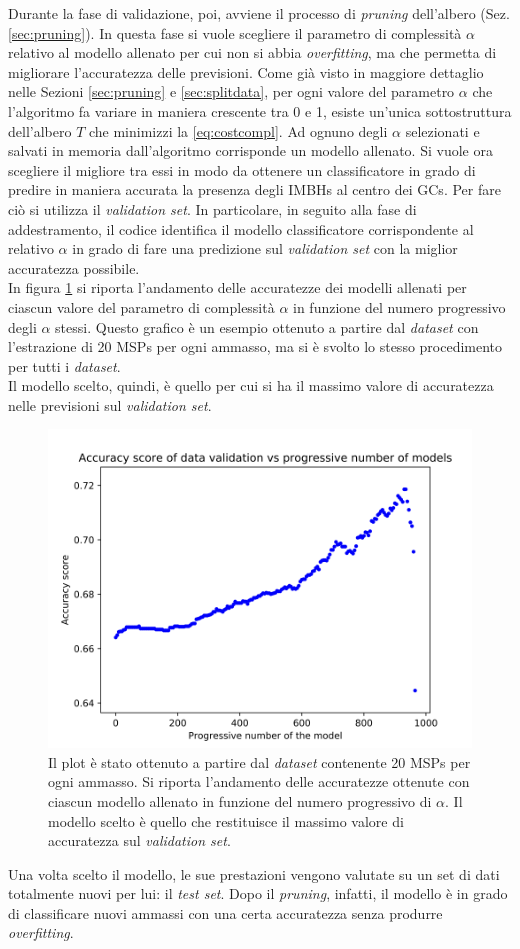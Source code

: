 Durante la fase di validazione, poi, avviene il processo di \textit{pruning} dell'albero (Sez. \ref{sec:pruning}). In questa fase si vuole scegliere il parametro di complessità $\alpha$ relativo al modello allenato per cui non si abbia \textit{overfitting}, ma che permetta di migliorare l'accuratezza delle previsioni. Come già visto in maggiore dettaglio nelle Sezioni \ref{sec:pruning} e \ref{sec:splitdata}, per ogni valore del parametro $\alpha$ che l'algoritmo fa variare in maniera crescente tra 0 e 1, esiste un'unica sottostruttura dell'albero $T$ che minimizzi la \ref{eq:costcompl}. Ad ognuno degli $\alpha$ selezionati e salvati in memoria dall'algoritmo corrisponde un modello allenato. Si vuole ora scegliere il migliore tra essi in modo da ottenere un classificatore in grado di predire in maniera accurata la presenza degli IMBHs al centro dei GCs. Per fare ciò si utilizza il \textit{validation set}. In particolare, in seguito alla fase di addestramento, il codice identifica il modello classificatore corrispondente al relativo $\alpha$ in grado di fare una predizione sul \textit{validation set} con la miglior accuratezza possibile.\\
In figura \ref{fig:acc_20part} si riporta l'andamento delle accuratezze dei modelli allenati per ciascun valore del parametro di complessità $\alpha$ in funzione del numero progressivo degli $\alpha$ stessi. Questo grafico è un esempio ottenuto a partire dal \textit{dataset} con l'estrazione di 20 MSPs per ogni ammasso, ma si è svolto lo stesso procedimento per tutti i \textit{dataset}.\\
Il modello scelto, quindi, è quello per cui si ha il massimo valore di accuratezza nelle previsioni sul \textit{validation set}.

\begin{figure}[ht]
\begin{center}
\includegraphics[width=0.7\columnwidth]{images/acc_val_20part.png}
\end{center}
\caption{Il plot è stato ottenuto a partire dal \textit{dataset} contenente 20 MSPs per ogni ammasso. Si riporta l'andamento delle accuratezze ottenute con ciascun modello allenato in funzione del numero progressivo di $\alpha$. Il modello scelto è quello che restituisce il massimo valore di accuratezza sul \textit{validation set}.}
\label{fig:acc_20part}
\end{figure}

Una volta scelto il modello, le sue prestazioni vengono valutate su un set di dati totalmente nuovi per lui: il \textit{test set}. Dopo il \textit{pruning}, infatti, il modello è in grado di classificare nuovi ammassi con una certa accuratezza senza produrre \textit{overfitting}.

